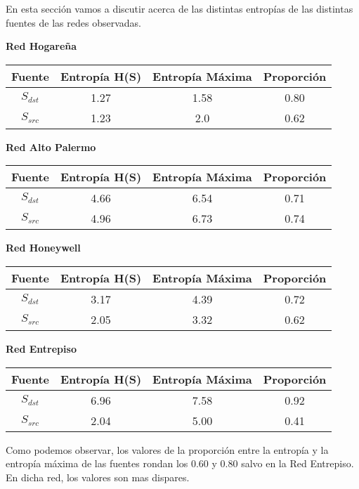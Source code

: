 En esta sección vamos a discutir acerca de las distintas entropías de las distintas fuentes de las redes observadas.

\begin{center}
\textbf{Red Hogareña}

\begin{tabular}{|c|c|c|c|}
\hline
Fuente&Entropía H(S)&Entropía Máxima&Proporción\\
\hline
$S_{dst}$&1.27&1.58&0.80\\
$S_{src}$&1.23&2.0&0.62\\ 
\hline
\end{tabular}
\end{center}

\begin{center}
\textbf{Red Alto Palermo}

\begin{tabular}{|c|c|c|c|}
\hline
Fuente&Entropía H(S)&Entropía Máxima&Proporción\\
\hline
$S_{dst}$&4.66&6.54&0.71\\
$S_{src}$&4.96&6.73&0.74\\ 
\hline
\end{tabular}
\end{center}

\begin{center}
\textbf{Red Honeywell}

\begin{tabular}{|c|c|c|c|}
\hline
Fuente&Entropía H(S)&Entropía Máxima&Proporción\\
\hline
$S_{dst}$&3.17&4.39&0.72\\
$S_{src}$&2.05&3.32&0.62\\ 
\hline
\end{tabular}
\end{center}

\begin{center}
\textbf{Red Entrepiso}
 
  \begin{tabular}{|c|c|c|c|}
  \hline
  Fuente&Entropía H(S)&Entropía Máxima&Proporción\\
  \hline
  $S_{dst}$&6.96&7.58&0.92\\
  $S_{src}$&2.04&5.00&0.41\\ 
  \hline
  \end{tabular}
\end{center}

Como podemos observar, los valores de la proporción entre la entropía y la entropía máxima de las fuentes rondan los 0.60 y 0.80 salvo en la Red Entrepiso. En dicha red, los valores son mas dispares. 

